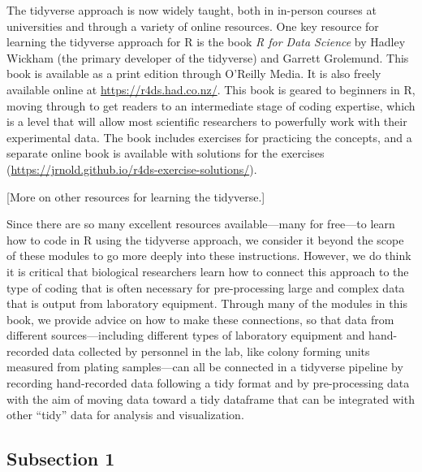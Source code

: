 \documentclass[]{tufte-book}
\begin{document}
The tidyverse approach is now widely taught, both in in-person courses at
universities and through a variety of online resources. One key resource for
learning the tidyverse approach for R is the book \emph{R for Data Science} by Hadley
Wickham (the primary developer of the tidyverse) and Garrett Grolemund. This
book is available as a print edition through O'Reilly Media. It is also freely
available online at \url{https://r4ds.had.co.nz/}. This book is geared to beginners in
R, moving through to get readers to an intermediate stage of coding expertise,
which is a level that will allow most scientific researchers to powerfully
work with their experimental data. The book includes exercises for practicing the
concepts, and a separate online book is available with solutions for the
exercises (\url{https://jrnold.github.io/r4ds-exercise-solutions/}).

{[}More on other resources for learning the tidyverse.{]}

Since there are so many excellent resources available---many for free---to learn
how to code in R using the tidyverse approach, we consider it beyond the scope
of these modules to go more deeply into these instructions. However, we do think
it is critical that biological researchers learn how to connect this approach to
the type of coding that is often necessary for pre-processing large and complex
data that is output from laboratory equipment. Through many of the modules in this book,
we provide advice on how to make these connections, so that data from different
sources---including different types of laboratory equipment and hand-recorded data
collected by personnel in the lab, like colony forming units measured from plating
samples---can all be connected in a tidyverse pipeline by recording hand-recorded
data following a tidy format and by pre-processing data with the aim of moving
data toward a tidy dataframe that can be integrated with other ``tidy'' data for
analysis and visualization.

\hypertarget{subsection-1-5}{%
\subsection{Subsection 1}\label{subsection-1-5}}
\end{document}
